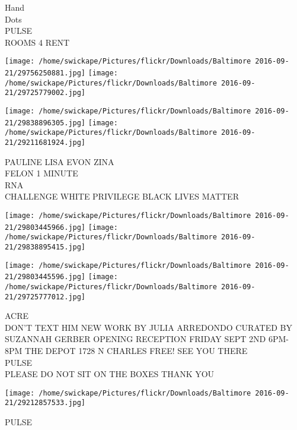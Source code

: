 \documentclass[10pt,letterpaper]{article}
\begin{document}
Hand\\
Dots\\
PULSE\\
ROOMS 4 RENT\\
\pagebreak

\texttt{[image: /home/swickape/Pictures/flickr/Downloads/Baltimore 2016-09-21/29756250881.jpg]}
\texttt{[image: /home/swickape/Pictures/flickr/Downloads/Baltimore 2016-09-21/29725779002.jpg]}

\texttt{[image: /home/swickape/Pictures/flickr/Downloads/Baltimore 2016-09-21/29838896305.jpg]}
\texttt{[image: /home/swickape/Pictures/flickr/Downloads/Baltimore 2016-09-21/29211681924.jpg]}

PAULINE LISA EVON ZINA\\
FELON 1 MINUTE\\
RNA\\
CHALLENGE WHITE PRIVILEGE BLACK LIVES MATTER\\
\pagebreak

\texttt{[image: /home/swickape/Pictures/flickr/Downloads/Baltimore 2016-09-21/29803445966.jpg]}
\texttt{[image: /home/swickape/Pictures/flickr/Downloads/Baltimore 2016-09-21/29838895415.jpg]}

\texttt{[image: /home/swickape/Pictures/flickr/Downloads/Baltimore 2016-09-21/29803445596.jpg]}
\texttt{[image: /home/swickape/Pictures/flickr/Downloads/Baltimore 2016-09-21/29725777012.jpg]}

ACRE\\
DON'T TEXT HIM NEW WORK BY JULIA ARREDONDO CURATED BY SUZANNAH GERBER OPENING RECEPTION FRIDAY SEPT 2ND 6PM{-}8PM THE DEPOT 1728 N CHARLES FREE! SEE YOU THERE\\
PULSE\\
PLEASE DO NOT SIT ON THE BOXES THANK YOU\\
\pagebreak

\texttt{[image: /home/swickape/Pictures/flickr/Downloads/Baltimore 2016-09-21/29212857533.jpg]}

PULSE\\
\pagebreak
\end{document}
